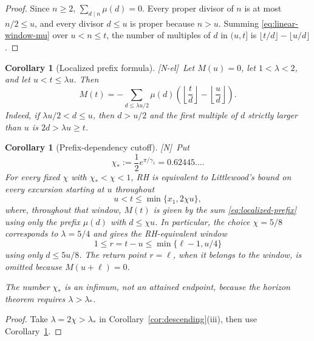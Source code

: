 \documentclass[11pt,reqno]{amsart}
\numberwithin{equation}{section}
\theoremstyle{plain}
\newtheorem{corollary}[theorem]{Corollary}
\theoremstyle{definition}
\theoremstyle{remark}
\newcommand{\tagN}{\textup{[N]}}
\newcommand{\tagNE}{\textup{[N-el]}}
\begin{document}
\begin{proof}
Since $n\ge2$, $\sum_{d\mid n}\mu(d)=0$. Every proper divisor of $n$ is at
most $n/2\le u$, and every divisor $d\le u$ is proper because $n>u$. Summing
\eqref{eq:linear-window-mu} over $u<n\le t$, the number of multiples of $d$
in $(u,t]$ is $\lfloor t/d\rfloor-\lfloor u/d\rfloor$.
\end{proof}

\begin{corollary}[Localized prefix formula]
\label{cor:localized-prefix}
\tagNE\ Let $M(u)=0$, let $1<\lambda<2$, and let $u<t\le\lambda u$.  Then
\begin{equation}
\label{eq:localized-prefix}
M(t)=-\sum_{d\le\lambda u/2}\mu(d)
\left(\left\lfloor\frac td\right\rfloor-
\left\lfloor\frac ud\right\rfloor\right).
\end{equation}
Indeed, if $\lambda u/2<d\le u$, then $d>u/2$ and the first multiple of
$d$ strictly larger than $u$ is $2d>\lambda u\ge t$.
\end{corollary}

\begin{corollary}[Prefix-dependency cutoff]
\label{cor:prefix-cutoff}
\tagN\ Put
\begin{equation}
\chi_*:=\frac12e^{\pi/\gamma_1}=0.62445\ldots .
\end{equation}
For every fixed $\chi$ with $\chi_*<\chi<1$, RH is equivalent to
Littlewood's bound on every excursion starting at $u$ throughout
\begin{equation}
u<t\le\min\{x_1,2\chi u\},
\end{equation}
where, throughout that window, $M(t)$ is given by the sum
\eqref{eq:localized-prefix} using only the prefix
$\mu(d)$ with $d\le\chi u$.  In particular, the choice
$\chi=5/8$ corresponds to $\lambda=5/4$ and gives the RH-equivalent
window
\begin{equation}
1\le r=t-u\le\min\{\ell-1,u/4\}
\end{equation}
using only $d\le5u/8$. The return point $r=\ell$, when it belongs to the
window, is omitted because $M(u+\ell)=0$.

The number $\chi_*$ is an infimum, not an attained endpoint, because the
horizon theorem requires $\lambda>\lambda_*$.
\end{corollary}

\begin{proof}
Take $\lambda=2\chi>\lambda_*$ in
Corollary~\ref{cor:descending}(iii), then use
Corollary~\ref{cor:localized-prefix}.
\end{proof}
\end{document}
